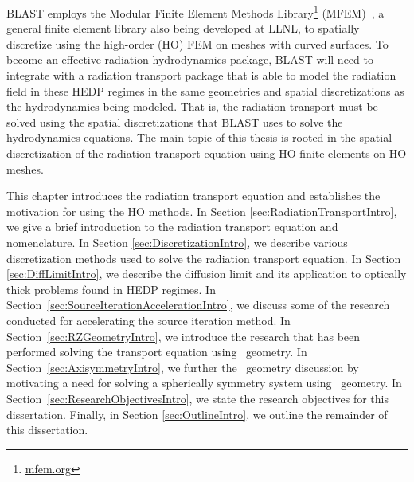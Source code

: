 \documentclass{article}
\begin{document}
BLAST employs the Modular Finite Element Methods Library\footnote{\url{mfem.org}} (MFEM)~\cite{MFEM_Web}, a general finite element library also being developed at LLNL, to spatially discretize using the high-order (HO) FEM on meshes with curved surfaces. To  become an effective radiation hydrodynamics package, BLAST will need to integrate with a radiation transport package that is able to model the radiation field in these HEDP regimes in the same geometries and spatial discretizations as the hydrodynamics being modeled. That is, the radiation transport must be solved using the spatial discretizations that BLAST uses to solve the hydrodynamics equations. The main topic of this thesis is rooted in the spatial discretization of the radiation transport equation using HO finite elements on HO meshes.

This chapter introduces the radiation transport equation and establishes the motivation for using the HO methods. In Section \ref{sec:RadiationTransportIntro}, we give a brief introduction to the radiation transport equation and nomenclature. In Section \ref{sec:DiscretizationIntro}, we describe various discretization methods used to solve the radiation transport equation. In Section \ref{sec:DiffLimitIntro}, we describe the diffusion limit and its application to optically thick problems found in HEDP regimes. In Section~\ref{sec:SourceIterationAccelerationIntro}, we discuss some of the research conducted for accelerating the source iteration method. In Section~\ref{sec:RZGeometryIntro}, we introduce the research that has been performed solving the transport equation using \RZ\ geometry. In Section~\ref{sec:AxisymmetryIntro}, we further the \RZ\ geometry discussion by motivating a need for solving a spherically symmetry system using \RZ\ geometry. In Section~\ref{sec:ResearchObjectivesIntro}, we state the research objectives for this dissertation. Finally, in Section \ref{sec:OutlineIntro}, we outline the remainder of this dissertation.

\end{document}
